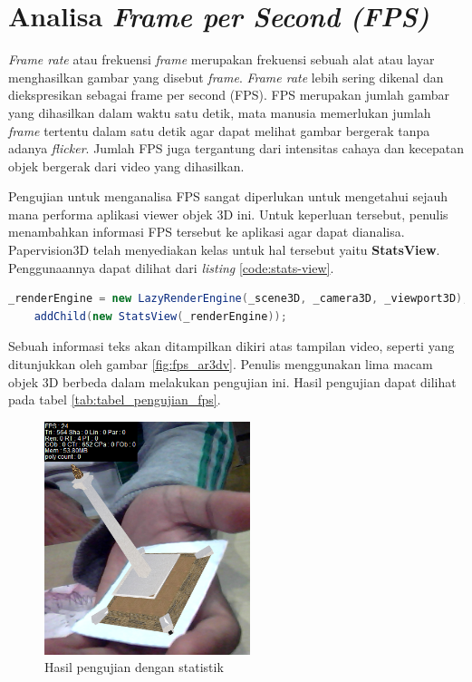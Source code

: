 \section{Analisa \textit{Frame per Second (FPS)}}
\label{sec:analisa_fps}
\textit{Frame rate} atau frekuensi \textit{frame} merupakan frekuensi sebuah alat atau layar menghasilkan gambar yang disebut \textit{frame}. \textit{Frame rate} lebih sering dikenal dan diekspresikan sebagai frame per second (FPS). FPS merupakan jumlah gambar yang dihasilkan dalam waktu satu detik, mata manusia memerlukan jumlah \textit{frame} tertentu dalam satu detik agar dapat melihat gambar bergerak tanpa adanya \textit{flicker}. Jumlah FPS juga tergantung dari intensitas cahaya dan kecepatan objek bergerak dari video yang dihasilkan.

Pengujian untuk menganalisa FPS sangat diperlukan untuk mengetahui sejauh mana performa aplikasi viewer objek 3D ini. Untuk keperluan tersebut, penulis menambahkan informasi FPS tersebut ke aplikasi agar dapat dianalisa. Papervision3D telah menyediakan kelas untuk hal tersebut yaitu \textbf{StatsView}. Penggunaannya dapat dilihat dari \textit{listing} \ref{code:stats-view}.

\begin{lstlisting}[language=ActionScript,caption=StatsView,label=code:stats-view]
	_renderEngine = new LazyRenderEngine(_scene3D, _camera3D, _viewport3D);
	addChild(new StatsView(_renderEngine));
\end{lstlisting}

Sebuah informasi teks akan ditampilkan dikiri atas tampilan video, seperti yang ditunjukkan oleh gambar \ref{fig:fps_ar3dv}. Penulis menggunakan lima macam objek 3D berbeda dalam melakukan pengujian ini. Hasil pengujian dapat dilihat pada tabel \ref{tab:tabel_pengujian_fps}.

\begin{figure}[h]
\begin{center}
\includegraphics[width=6cm]{./images/ar3dv/monas_stats}
\caption{\label{fig:monas_stats} Hasil pengujian dengan statistik}
\end{center}
\end{figure}

